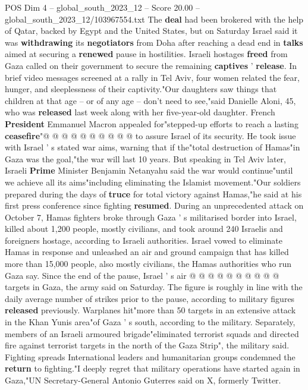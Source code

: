 \begin{textsample}{POS Dim 4 – global\_south\_2023\_12 – Score 20.00 – global\_south\_2023\_12/103967554.txt}
The \textbf{deal} had been brokered with the help of Qatar, backed by Egypt and the United States, but on Saturday Israel said it was \textbf{withdrawing} its \textbf{negotiators} from Doha after reaching a dead end in \textbf{talks} aimed at securing a \textbf{renewed} pause in hostilities.
Israeli hostages \textbf{freed} from Gaza called on their government to secure the remaining \textbf{captives} ' \textbf{release}.
In brief video messages screened at a rally in Tel Aviv, four women related the fear, hunger, and sleeplessness of their captivity."Our daughters saw things that children at that age -- or of any age -- don't need to see,"said Danielle Aloni, 45, who was \textbf{released} last week along with her five-year-old daughter.
French \textbf{President} Emmanuel Macron appealed for"stepped-up efforts to reach a lasting \textbf{ceasefire}"@ @ @ @ @ @ @ @ @ @ to assure Israel of its security.
He took issue with Israel ' s stated war aims, warning that if the"total destruction of Hamas"in Gaza was the goal,"the war will last 10 years.
But speaking in Tel Aviv later, Israeli \textbf{Prime} Minister Benjamin Netanyahu said the war would continue"until we achieve all its aims"including eliminating the Islamist movement."Our soldiers prepared during the days of \textbf{truce} for total victory against Hamas,"he said at his first press conference since fighting \textbf{resumed}.
During an unprecedented attack on October 7, Hamas fighters broke through Gaza ' s militarised border into Israel, killed about 1,200 people, mostly civilians, and took around 240 Israelis and foreigners hostage, according to Israeli authorities.
Israel vowed to eliminate Hamas in response and unleashed an air and ground campaign that has killed more than 15,000 people, also mostly civilians, the Hamas authorities who run Gaza say.
Since the end of the pause, Israel ' s air @ @ @ @ @ @ @ @ @ @ targets in Gaza, the army said on Saturday.
The figure is roughly in line with the daily average number of strikes prior to the pause, according to military figures \textbf{released} previously.
Warplanes hit"more than 50 targets in an extensive attack in the Khan Yunis area"of Gaza ' s south, according to the military.
Separately, members of an Israeli armoured brigade"eliminated terrorist squads and directed fire against terrorist targets in the north of the Gaza Strip", the military said.
Fighting spreads International leaders and humanitarian groups condemned the \textbf{return} to fighting."I deeply regret that military operations have started again in Gaza,"UN Secretary-General Antonio Guterres said on X, formerly Twitter.

\end{textsample}
